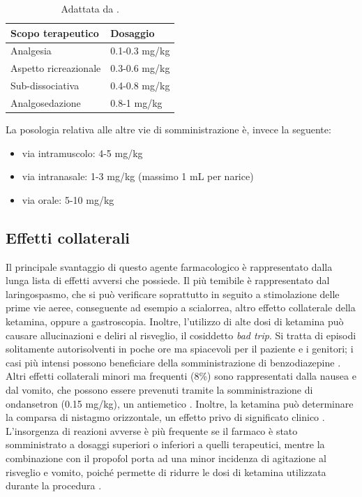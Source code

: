 \bgroup
\def\arraystretch{1.5}
\begin{table}[!h]
    \centering
    \begin{tabular}{|l|l|}
       Scopo terapeutico     & Dosaggio \\ \hline
       Analgesia & 0.1-0.3 mg/kg  \\
       Aspetto ricreazionale & 0.3-0.6 mg/kg \\
       Sub-dissociativa & 0.4-0.8 mg/kg \\
       Analgosedazione & 0.8-1 mg/kg 
    \end{tabular}
    \caption{Adattata da \cite{Simeupsedazione}.}
    \label{tab:1}
\end{table}
\egroup


La posologia relativa alle altre vie di somministrazione è, invece la seguente: 
\begin{itemize}
    \item via intramuscolo: 4-5 mg/kg
    \item via intranasale: 1-3 mg/kg (massimo 1 mL per narice)
    \item via orale: 5-10 mg/kg
\end{itemize}

\subsection*{Effetti collaterali}

Il principale svantaggio di questo agente farmacologico è rappresentato dalla lunga lista di effetti avversi che possiede. Il più temibile è rappresentato dal laringospasmo, che si può verificare soprattutto in seguito a stimolazione delle prime vie aeree, conseguente ad esempio a scialorrea, altro effetto collaterale della ketamina, oppure a gastroscopia. Inoltre, l'utilizzo di alte dosi di ketamina può causare allucinazioni e deliri al risveglio, il cosiddetto \emph{bad trip}. Si tratta di episodi solitamente autorisolventi in poche ore ma spiacevoli per il paziente e i genitori; i casi più intensi possono beneficiare della somministrazione di benzodiazepine \cite{Simeupsedazione}. Altri effetti collaterali minori ma frequenti (8\%) sono rappresentati dalla nausea e dal vomito, che possono essere prevenuti tramite la somministrazione di ondansetron (0.15 mg/kg), un antiemetico \cite{Uptodatepharmacology}. Inoltre, la ketamina può determinare la comparsa di nistagmo orizzontale, un effetto privo di significato clinico \cite{Simeupsedazione}. 
\\L'insorgenza di reazioni avverse è più frequente se il farmaco è stato somministrato a dosaggi superiori o inferiori a quelli terapeutici, mentre la combinazione con il propofol porta ad una minor incidenza di agitazione al risveglio e vomito, poiché permette di ridurre le dosi di ketamina utilizzata durante la procedura \cite{Simeupsedazione, Shah2011}. 

